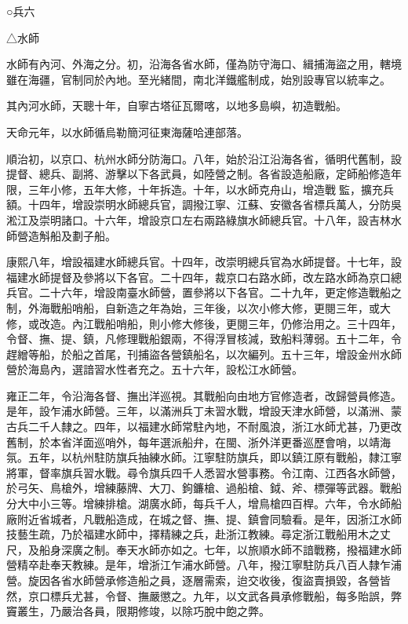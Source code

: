 
\begin{pinyinscope}
○兵六

△水師

水師有內河、外海之分。初，沿海各省水師，僅為防守海口、緝捕海盜之用，轄境雖在海疆，官制同於內地。至光緒間，南北洋鐵艦制成，始別設專官以統率之。

其內河水師，天聰十年，自寧古塔征瓦爾喀，以地多島嶼，初造戰船。

天命元年，以水師循烏勒簡河征東海薩哈連部落。

順治初，以京口、杭州水師分防海口。八年，始於沿江沿海各省，循明代舊制，設提督、總兵、副將、游擊以下各武員，如陸營之制。各省設造船廠，定師船修造年限，三年小修，五年大修，十年拆造。十年，以水師克舟山，增造戰監，擴充兵額。十四年，增設崇明水師總兵官，調撥江寧、江蘇、安徽各省標兵萬人，分防吳淞江及崇明諸口。十六年，增設京口左右兩路綠旗水師總兵官。十八年，設吉林水師營造斛船及劃子船。

康熙八年，增設福建水師總兵官。十四年，改崇明總兵官為水師提督。十七年，設福建水師提督及參將以下各官。二十四年，裁京口右路水師，改左路水師為京口總兵官。二十六年，增設南臺水師營，置參將以下各官。二十九年，更定修造戰船之制，外海戰船哨船，自新造之年為始，三年後，以次小修大修，更閱三年，或大修，或改造。內江戰船哨船，則小修大修後，更閱三年，仍修治用之。三十四年，令督、撫、提、鎮，凡修理戰船銀兩，不得浮冒核減，致船料薄弱。五十二年，令趕繒等船，於船之首尾，刊捕盜各營鎮船名，以次編列。五十三年，增設金州水師營於海島內，選諳習水性者充之。五十六年，設松江水師營。

雍正二年，令沿海各督、撫出洋巡視。其戰船向由地方官修造者，改歸營員修造。是年，設乍浦水師營。三年，以滿洲兵丁未習水戰，增設天津水師營，以滿洲、蒙古兵二千人隸之。四年，以福建水師常駐內地，不耐風浪，浙江水師尤甚，乃更改舊制，於本省洋面巡哨外，每年選派船弁，在閩、浙外洋更番巡歷會哨，以靖海氛。五年，以杭州駐防旗兵抽練水師。江寧駐防旗兵，即以鎮江原有戰船，隸江寧將軍，督率旗兵習水戰。尋令旗兵四千人悉習水營事務。令江南、江西各水師營，於弓矢、鳥槍外，增練藤牌、大刀、鉤鐮槍、過船槍、鉞、斧、標彈等武器。戰船分大中小三等。增練排槍。湖廣水師，每兵千人，增鳥槍四百桿。六年，令水師船廠附近省城者，凡戰船造成，在城之督、撫、提、鎮會同驗看。是年，因浙江水師技藝生疏，乃於福建水師中，擇精練之兵，赴浙江教練。尋定浙江戰船用木之丈尺，及船身深廣之制。奉天水師亦如之。七年，以旅順水師不諳戰務，撥福建水師營精卒赴奉天教練。是年，增浙江乍浦水師營。八年，撥江寧駐防兵八百人隸乍浦營。旋因各省水師營承修造船之員，逐層需索，迨交收後，復盜賣損毀，各營皆然，京口標兵尤甚，令督、撫嚴懲之。九年，以文武各員承修戰船，每多貽誤，弊竇叢生，乃嚴治各員，限期修竣，以除巧脫中飽之弊。


\end{pinyinscope}
